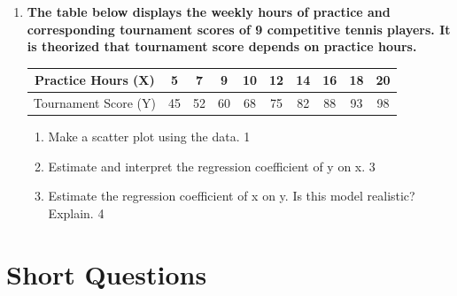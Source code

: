 \documentclass[a4paper,oneside]{book}
\begin{document}
\begin{enumerate}
\begin{enumerate}
    \item What is correlation? \hfill 1
    \item Make a scatter plot from the given data and propose the association of the variables. \hfill 2
    \item
    Find and interpret the correlation coefficient. \hfill 3
    
    \item
    Fit the regression line and predict the monthly sales when advertising expenditure is \$9,000. \hfill 4
\end{enumerate}

\item
  \textbf{The table below displays the weekly hours of practice and corresponding tournament scores of 9 competitive tennis players. It is theorized that tournament score depends on practice hours.}

\begin{table}[h!]
\centering
\begin{tabular}{c|c|c|c|c|c|c|c|c|c}
Practice Hours (X) & 5 & 7 & 9 & 10 & 12 & 14 & 16 & 18 & 20 \\ \hline
Tournament Score (Y) & 45 & 52 & 60 & 68 & 75 & 82 & 88 & 93 & 98 \\
\end{tabular}
\end{table}

\begin{enumerate}
    \item Make a scatter plot using the data. \hfill 1
    \item
    Estimate and interpret the regression coefficient of y on x. \hfill 3
    
    \item
    Estimate the regression coefficient of x on y. Is this model realistic? Explain. \hfill 4
\end{enumerate}
\end{enumerate}

\section{Short Questions}
\end{document}
